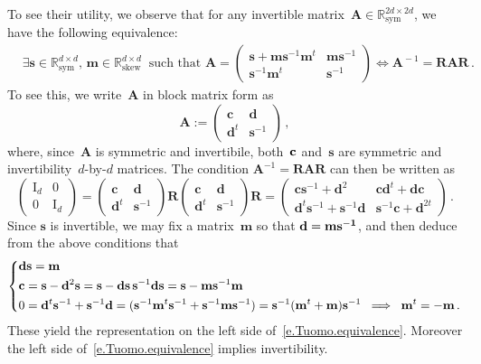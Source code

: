 \documentclass[11pt]{article} %
\numberwithin{equation}{section}
\theoremstyle{definition}
\let\originalleft\left
\let\originalright\right
\renewcommand{\left}{\mathopen{}\mathclose\bgroup\originalleft}
\renewcommand{\right}{\aftergroup\egroup\originalright}
\newcommand*{\Id}{\ensuremath{\mathrm{I}_d}}
\newcommand*{\R}{\ensuremath{\mathbb{R}}}
\newcommand{\s}{\mathbf{s}}
\newcommand{\m}{\mathbf{m}}
\newcommand{\bfA}{\mathbf{A}}
\newcommand{\rota}{\mathbf{R}}
\begin{document}
To see their utility, we observe that for any invertible matrix~$\bfA \in \R^{2d\times 2d}_{\mathrm{sym}}$, we have the following equivalence:
\begin{align}
\label{e.Tuomo.equivalence}
&
\exists 
\s \in \R^{d\times d}_{\mathrm{sym}}, \, \m \in \R^{d\times d}_{\mathrm{skew}}
\ \mbox{ such that } 
\bfA = 
\begin{pmatrix} \s + \m\s^{-1}\m^t & \m\s^{-1} \\ \s^{-1}\m^t & \s^{-1} \end{pmatrix}
\iff
\bfA^{\!-1} = \rota \bfA \rota
\,.
\end{align}
To see this, we write~$\bfA$ in block matrix form as 
\begin{equation*}  
{\bfA} := 
\begin{pmatrix} 
\mathbf{c} & \mathbf{d} \\ \mathbf{d}^t & \s^{-1} \end{pmatrix} 
\,,
\end{equation*}
where, since~$\bfA$ is symmetric and invertibile, both~$\bf{c}$ and~$\s$ are symmetric and invertibility~$d$-by-$d$ matrices. 
The condition ${\bfA}^{-1} =  \rota {\bfA} \rota$ can then be written as 
\begin{equation*}  
\begin{pmatrix} \Id & 0 \\ 0 & \Id  \end{pmatrix} 
=
\begin{pmatrix} \mathbf{c} & \mathbf{d} \\ \mathbf{d}^t & \s^{-1}\end{pmatrix}
\rota  \begin{pmatrix} \mathbf{c} & \mathbf{d} \\ \mathbf{d}^t & \s^{-1}\end{pmatrix} \rota 
= 
\begin{pmatrix}
 \mathbf{c}  \s^{-1} + \mathbf{d}^2 & \mathbf{c} \mathbf{d}^t + \mathbf{d} \mathbf{c} \\ \mathbf{d}^t \s^{-1} + \s^{-1} \mathbf{d} & \s^{-1} \mathbf{c} + \mathbf{d}^{2t}  \end{pmatrix}
\,.
\end{equation*}
Since $\s$ is invertible, we may fix a matrix~$\m$ so that $\bf{d} = \m \s^{-1}$, and then deduce from the above conditions that  
\begin{equation*}   
\left\{
\begin{aligned}
& \mathbf{d} \s  =  \m 
\\
& \mathbf{c}  =  \s - \mathbf{d}^2 \s 
 = \s - \mathbf{d} \s \, \s^{-1}  \mathbf{d} \s =  \s - \m  \s^{-1}  \m
\\ 
\notag 
& 0 =  \mathbf{d}^t \s^{-1} + \s^{-1} \mathbf{d} = ( \s^{-1}  \m^t \s^{-1} + \s^{-1} \m \s^{-1}  ) = 
 \s^{-1} ( \m^t  +  \m  )\s^{-1} \; \implies \;   \m^t =  -\m
\,.
\end{aligned}
\right.
\end{equation*}
These yield the representation on the left side of~\eqref{e.Tuomo.equivalence}. Moreover the left side of~\eqref{e.Tuomo.equivalence} implies invertibility. 
\end{document}
